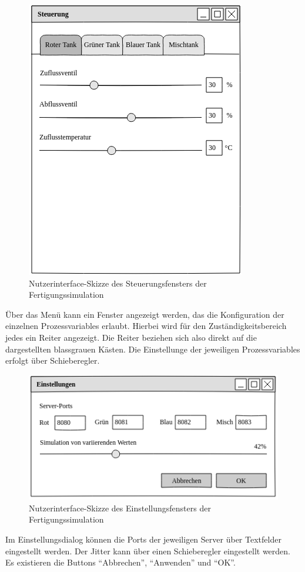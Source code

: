 \documentclass[parskip=full]{scrartcl}
\begin{document}
\begin{figure}[H]
  \centering
  \includegraphics[scale=0.5]{media/ui-server/ui-server-control.png}
  \caption{Nutzerinterface-Skizze des Steuerungsfensters der Fertigungssimulation}
\end{figure}
Über das Menü kann ein Fenster angezeigt werden, das die Konfiguration der einzelnen \glspl{Prozessvariable} erlaubt. Hierbei
wird für den Zuständigkeitsbereich jedes  ein Reiter angezeigt. Die Reiter beziehen sich also
direkt auf die dargestellten blassgrauen Kästen. Die Einstellunge der jeweiligen \glspl{Prozessvariable} erfolgt über Schieberegler.

\begin{figure}[H]
  \centering
  \includegraphics[scale=0.5]{media/ui-server/ui-server-settings.png}
  \caption{Nutzerinterface-Skizze des Einstellungsfensters der Fertigungssimulation}
\end{figure}
Im Einstellungsdialog können die Ports der jeweiligen Server über Textfelder eingestellt werden. Der \gls{Jitter} kann über einen Schieberegler
eingestellt werden. Es existieren die Buttons "`Abbrechen"', "`Anwenden"' und "`OK"'.
\end{document}
